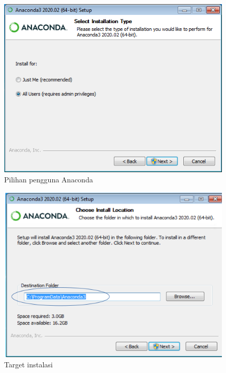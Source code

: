 \begin{figure}[h!]
  \begin{center}
    \includegraphics[scale=.5]{pics/anacondaInstall3.png}
    \caption{Pilihan pengguna Anaconda}
    \label{fig:pengguna}
  \end{center}
\end{figure}

\begin{figure}[h!]
  \begin{center}
    \includegraphics[scale=.5]{pics/anacondaInstall4a.png}
    \caption{Target instalasi}
    \label{fig:target}
  \end{center}
\end{figure}

